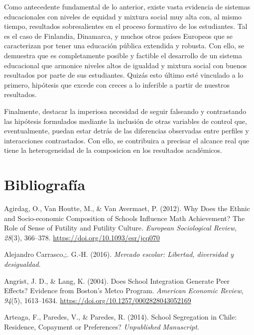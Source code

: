 \documentclass[
]{article}
\begin{document}
Como antecedente fundamental de lo anterior, existe vasta evidencia de
sistemas educacionales con niveles de equidad y mixtura social muy alta
con, al mismo tiempo, resultados sobresalientes en el proceso formativo
de los estudiantes. Tal es el caso de Finlandia, Dinamarca, y muchos
otros países Europeos que se caracterizan por tener una educación
pública extendida y robusta. Con ello, se demuestra que es completamente
posible y factible el desarrollo de un sistema educacional que armonice
niveles altos de igualdad y mixtura social con buenos resultados por
parte de sus estudiantes. Quizás esto último esté vinculado a lo
primero, hipótesis que excede con creces a lo inferible a partir de
nuestros resultados.

Finalmente, destacar la imperiosa necesidad de seguir falseando y
contrastando las hipótesis formulados mediante la inclusión de otras
variables de control que, eventualmente, puedan estar detrás de las
diferencias observadas entre perfiles y interacciones contrastados. Con
ello, se contribuira a precisar el alcance real que tiene la
heterogeneidad de la composicion en los resultados académicos.

\hypertarget{bibliografuxeda}{%
\section*{Bibliografía}\label{bibliografuxeda}}

\hypertarget{refs}{}
\leavevmode\hypertarget{ref-agirdag_why_2012}{}%
Agirdag, O., Van Houtte, M., \& Van Avermaet, P. (2012). Why Does the
Ethnic and Socio-economic Composition of Schools Influence Math
Achievement? The Role of Sense of Futility and Futility Culture.
\emph{European Sociological Review}, \emph{28}(3), 366--378.
\url{https://doi.org/10.1093/esr/jcq070}

\leavevmode\hypertarget{ref-alejandrocarrasco_mercado_2016}{}%
Alejandro Carrasco,;. G.-H. (2016). \emph{Mercado escolar: Libertad,
diversidad y desigualdad}.

\leavevmode\hypertarget{ref-angrist_does_2004}{}%
Angrist, J. D., \& Lang, K. (2004). Does School Integration Generate
Peer Effects? Evidence from Boston's Metco Program. \emph{American
Economic Review}, \emph{94}(5), 1613--1634.
\url{https://doi.org/10.1257/0002828043052169}

\leavevmode\hypertarget{ref-arteaga_school_2014}{}%
Arteaga, F., Paredes, V., \& Paredes, R. (2014). School Segregation in
Chile: Residence, Copayment or Preferences? \emph{Unpublished
Manuscript}.
\end{document}

